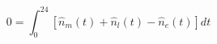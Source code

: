 \begin{equation}
0 = \int_{0}^{24}\left[\hat{n}_m(t) + \hat{n}_l(t) - \hat{n}_e(t)\right]dt
\end{equation}
